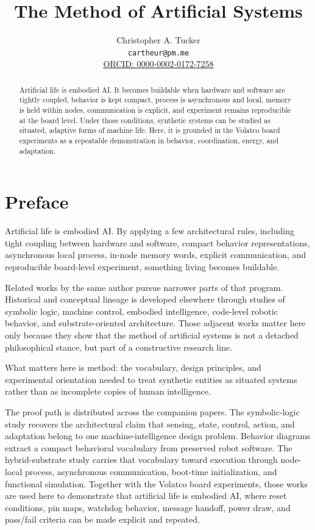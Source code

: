 \documentclass[a4paper,english]{article}
\begin{document}
\title{The Method of Artificial Systems}
\author{Christopher A. Tucker\\
\small \texttt{cartheur@pm.me}\\
\small \href{https://orcid.org/0000-0002-0172-7258}{ORCID: 0000-0002-0172-7258}}
\date{}
\maketitle
\begin{abstract}
Artificial life is embodied AI. It becomes buildable when hardware
and software are tightly coupled, behavior is kept compact, process
is asynchronous and local, memory is held within nodes, communication
is explicit, and experiment remains reproducible at the board level.
Under those conditions, synthetic systems can be studied as situated,
adaptive forms of machine life. Here, it is grounded in the Volatco
board experiments as a repeatable demonstration in behavior, coordination,
energy, and adaptation.
\end{abstract}

\section{Preface}

Artificial life is embodied AI. By applying a few architectural rules,
including tight coupling between hardware and software, compact behavior
representations, asynchronous local process, in-node memory words,
explicit communication, and reproducible board-level experiment, something
living becomes buildable.

Related works by the same author pursue narrower parts of that program.
Historical and conceptual lineage is developed elsewhere through studies
of symbolic logic, machine control, embodied intelligence, code-level
robotic behavior, and substrate-oriented architecture. Those adjacent
works matter here only because they show that the method of artificial
systems is not a detached philosophical stance, but part of a constructive
research line.

What matters here is method: the vocabulary, design principles, and
experimental orientation needed to treat synthetic entities as situated
systems rather than as incomplete copies of human intelligence.

The proof path is distributed across the companion papers. The symbolic-logic
study recovers the architectural claim that sensing, state, control,
action, and adaptation belong to one machine-intelligence design problem.
Behavior diagrams extract a compact behavioral vocabulary from preserved
robot software. The hybrid-substrate study carries that
vocabulary toward execution through node-local process, asynchronous
communication, boot-time initialization, and functional simulation.
Together with the Volatco board experiments, those works are used here
to demonstrate that artificial life is embodied AI, where reset conditions, pin maps,
watchdog behavior, message handoff, power draw, and pass/fail criteria
can be made explicit and repeated.
\end{document}
